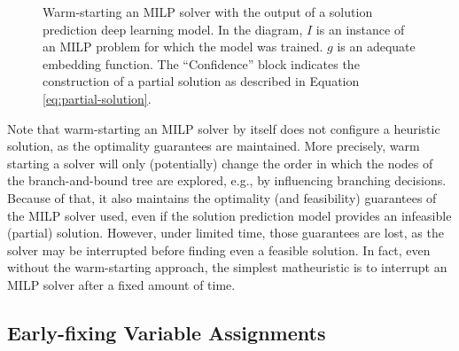 \begin{figure}[h]
    \centering
    \caption{Warm-starting an MILP solver with the output of a solution prediction deep learning model. In the diagram,  $I$ is an instance of an MILP problem for which the model was trained. $g$ is an adequate embedding function. The ``Confidence'' block indicates the construction of a partial solution as described in Equation \eqref{eq:partial-solution}.}
    \label{fig:warm-starting-diagram}
\end{figure}

Note that warm-starting an MILP solver by itself does not configure a heuristic solution, as the optimality guarantees are maintained.
More precisely, warm starting a solver will only (potentially) change the order in which the nodes of the branch-and-bound tree are explored, e.g., by influencing branching decisions.
Because of that, it also maintains the optimality (and feasibility) guarantees of the MILP solver used, even if the solution prediction model provides an infeasible (partial) solution.
However, under limited time, those guarantees are lost, as the solver may be interrupted before finding even a feasible solution.
In fact, even without the warm-starting approach, the simplest matheuristic is to interrupt an MILP solver after a fixed amount of time.


\subsection{Early-fixing Variable Assignments}

